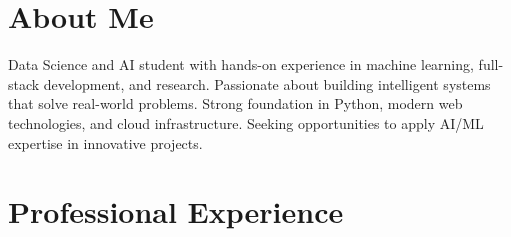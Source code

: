 \documentclass[a4paper,11pt]{article}
\begin{document}
\section{About Me}

Data Science and AI student with hands-on experience in machine learning, full-stack development, and research. Passionate about building intelligent systems that solve real-world problems. Strong foundation in Python, modern web technologies, and cloud infrastructure. Seeking opportunities to apply AI/ML expertise in innovative projects.

\section{Professional Experience}
\end{document}
